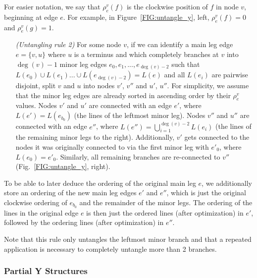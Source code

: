 \documentclass[format=acmsmall, review=false, screen=true]{acmart}
\begin{document}
For easier notation, we say that $\rho^v_e(f)$ is the clockwise position of $f$ in node $v$, beginning at edge $e$. For example, in Figure~\ref{FIG:untangle_y}, left, $\rho^v_e(f) = 0$ and $\rho^v_e(g) = 1$.
\begin{enumerate}[parsep=0.5mm, wide, labelwidth=0mm, itemindent=2.3mm]
  \setlength\itemsep{1pt}
  \item[\emph{(Untangling rule 2)}] For some node $v$, if we can identify a main leg edge $e = \{v, u\}$ where $u$ is a terminus and which completely branches at $v$ into $\deg(v) - 1$ minor leg edges $e_{0}, e_{1}, ..., e_{\deg(v) - 2}$ such that $L(e_{0}) \cup L(e_{1}) ... \cup L(e_{\deg(v) - 2}) = L(e)$ and all $L(e_{i})$ are pairwise disjoint, split $v$ and $u$ into nodes $v'$, $v''$ and $u'$, $u''$.
  For simplicity, we assume that the minor leg edges are already sorted in ascending order by their $\rho^v_{e}$ values. Nodes $v'$ and $u'$ are connected with an edge $e'$, where $L(e') = L(e_{b_0})$ (the lines of the leftmost minor leg). Nodes $v''$ and $u''$ are connected with an edge $e''$, where $L(e'') = \bigcup^{\deg(v) - 2}_{i = 1} L(e_{i})$ (the lines of the remaining minor legs to the right).
  Additionally, $v'$ gets connected to the nodes it was originally connected to via the first minor leg with $e'_{0}$, where $L(e_{0}) = e'_{0}$. Similarly, all remaining branches are re-connected to $v''$ (Fig.~\ref{FIG:untangle_y}, right).
\end{enumerate}

To be able to later deduce the ordering of the original main leg $e$, we additionally store an ordering of the new main leg edges $e'$ and $e''$, which is just the original clockwise ordering of $e_{b_0}$ and the remainder of the minor legs.
The ordering of the lines in the original edge $e$ is then just the ordered lines (after optimization) in $e'$, followed by the ordering lines (after optimization) in $e''$.

Note that this rule only untangles the leftmost minor branch and that a repeated application is necessary to completely untangle more than 2 branches.

\subsubsection{Partial Y Structures}\label{SEC:ypartial}
\end{document}

